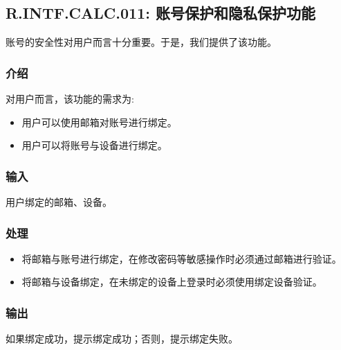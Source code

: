 \subsection{R.INTF.CALC.011: 账号保护和隐私保护功能}
账号的安全性对用户而言十分重要。于是，我们提供了该功能。
\subsubsection{介绍}
对用户而言，该功能的需求为:
\begin{itemize}
  \item 用户可以使用邮箱对账号进行绑定。
  \item 用户可以将账号与设备进行绑定。
\end{itemize}
\subsubsection{输入}
用户绑定的邮箱、设备。
\subsubsection{处理}
\begin{itemize}
  \item 将邮箱与账号进行绑定，在修改密码等敏感操作时必须通过邮箱进行验证。
  \item 将邮箱与设备绑定，在未绑定的设备上登录时必须使用绑定设备验证。
\end{itemize}
\subsubsection{输出}
如果绑定成功，提示绑定成功；否则，提示绑定失败。